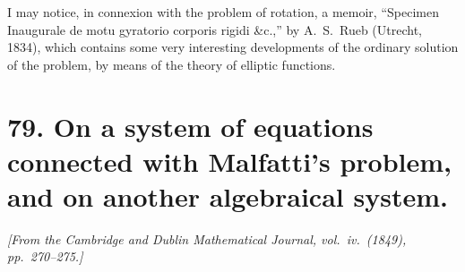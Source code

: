 \documentclass[11pt,a4paper]{book}
\begin{document}
I may notice, in connexion with the problem of rotation, a memoir, ``Specimen Inaugurale de motu gyratorio corporis rigidi \&c.,'' by A.\ S.\ Rueb (Utrecht, 1834), which contains some very interesting developments of the ordinary solution of the problem, by means of the theory of elliptic functions.



\newpage
\section*{79. On a system of equations connected with Malfatti's problem, and on another algebraical system.}

\begin{flushright}
\textit{[From the Cambridge and Dublin Mathematical Journal, vol.\ iv.\ (1849), pp.\ 270--275.]}
\end{flushright}

\setcounter{page}{465}
\end{document}
